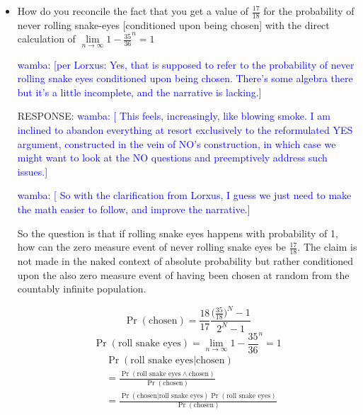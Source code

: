 \documentclass[article,twocolumn]{memoir}
\newcommand{\wamba} [1]{\ifnum\Chatty=1 \textcolor{blue}{wamba:  [#1]} \fi}
\begin{document}
\begin{itemize}
        \wamba{[TOD?O: add countably additive probability in lieu of a non-standard uniform prior, steal from Bartha-Hitchcock]}
        
        \wamba{[Do we even need to choose from an infinite population?  What if we simply say. With probability 1, you play in Round $i$, then what are the odds that the game ends in Round $i$ vs the odds that the game ends in Round $j>i$, again we ignore all the $j<i$]}
\item How do you reconcile the fact that you get a value of $\frac{17}{18}$ for the probability of never rolling snake-eyes [conditioned upon being chosen] with the direct calculation of $\underset{n\to\infty}{\lim}1-\frac{35}{36}^n=1$

\wamba{per Lorxus: Yes, that is supposed to refer to the  probability of never rolling snake eyes conditioned upon being chosen. There's some algebra there but it's a little incomplete, and the narrative is lacking.}
    
    {\color{red}
        RESPONSE: 
        \wamba{ This feels, increasingly, like blowing smoke. I am inclined to abandon everything at resort exclusively to the reformulated YES argument, constructed in the vein of NO's construction, in which case we might want to look at the NO questions and preemptively address such issues.}

        \wamba{ So with the clarification from Lorxus, I guess we just need to make the math easier to follow, and improve the narrative.}
        
        So the question is that if rolling snake eyes happens with probability of 1, how can the zero measure event of never rolling snake eyes be $\frac{17}{18}$.  The claim is not made in the naked context of absolute probability but rather conditioned upon the also zero measure event of having been chosen at random from the countably infinite population.

         $$\Pr(\text{chosen})= \frac{18}{17}\frac{\big(\frac{35}{18}\big)^N-1}{2^N-1}$$
         $$\Pr(\text{roll snake eyes})=\underset{n\to\infty}{\lim}1-\frac{35}{36}^n=1$$
         \begin{align*}
             &\Pr(\text{roll snake eyes|chosen})\\
             &=\frac{\Pr(\text{roll snake eyes}\land\text{chosen})}{\Pr(\text{chosen})}\\
             &=\frac{\Pr(\text{chosen|roll snake eyes})\Pr(\text{roll snake eyes})}{\Pr(\text{chosen})}
         \end{align*}
        
}
\end{itemize}
\end{document}
